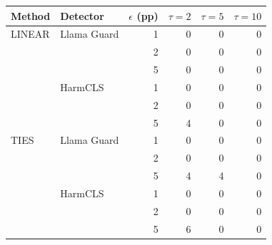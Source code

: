 \begin{tabular}{llrrrr}
\toprule
Method & Detector & $\epsilon$ (pp) & $\tau=2$ & $\tau=5$ & $\tau=10$ \\
\midrule
LINEAR & Llama Guard & 1 & 0 & 0 & 0 \\
 &  & 2 & 0 & 0 & 0 \\
 &  & 5 & 0 & 0 & 0 \\
 & HarmCLS & 1 & 0 & 0 & 0 \\
 &  & 2 & 0 & 0 & 0 \\
 &  & 5 & 4 & 0 & 0 \\
TIES & Llama Guard & 1 & 0 & 0 & 0 \\
 &  & 2 & 0 & 0 & 0 \\
 &  & 5 & 4 & 4 & 0 \\
 & HarmCLS & 1 & 0 & 0 & 0 \\
 &  & 2 & 0 & 0 & 0 \\
 &  & 5 & 6 & 0 & 0 \\
\bottomrule
\end{tabular}

